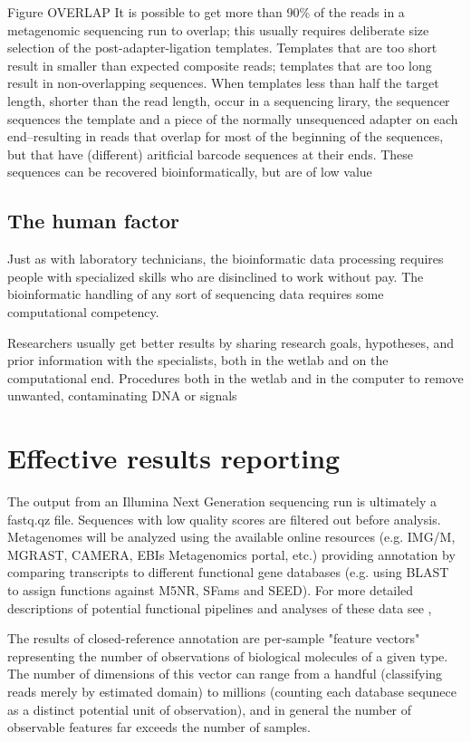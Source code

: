 \documentclass[graybox]{svmult}
\begin{document}
Figure OVERLAP
        It is possible to get more than 90\% of the reads in a metagenomic sequencing run to overlap; this usually requires deliberate size selection of the post-adapter-ligation templates.   Templates that are too short result in smaller than expected composite reads; templates that are too long result in non-overlapping sequences.   When templates less than half the target length, shorter than the read length, occur in a sequencing lirary, the sequencer sequences the template and a piece of the normally unsequenced adapter on each end--resulting in reads that overlap for most of the beginning of the sequences, but that have (different) aritficial barcode sequences at their ends.   These sequences can be recovered bioinformatically, but are of low value

\subsection{The human factor}
Just as with laboratory technicians, the bioinformatic data processing requires people with specialized skills who are disinclined to work without pay.  
The bioinformatic handling of any sort of sequencing data requires some computational competency.


Researchers usually get better results by sharing research goals, hypotheses, and prior information with the specialists, both in the wetlab and on the computational end.  Procedures both in the wetlab and in the computer to remove unwanted, contaminating DNA or signals 


\section{Effective results reporting }
\label{sec:5}

The output from an Illumina Next Generation sequencing run is ultimately a fastq.qz file. Sequences with low quality scores are filtered out before analysis. Metagenomes will be analyzed using the available online resources (e.g. IMG/M, MGRAST, CAMERA, EBIs Metagenomics portal, etc.) providing annotation by comparing transcripts to different functional gene databases (e.g. using BLAST to assign functions against M5NR, SFams and SEED). For more detailed descriptions of potential functional pipelines and analyses of these data see \cite{Thomas2012}, \cite{MG-RAST} \cite{API}

        The results of closed-reference annotation are per-sample "feature vectors" representing the number of observations of biological molecules of a given type.  The number of dimensions of this vector can range from a handful (classifying reads merely by estimated domain) to millions (counting each database sequnece as a distinct potential unit of observation), and in general the number of observable features far exceeds the number of samples.
\end{document}
